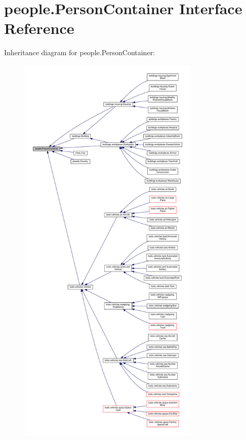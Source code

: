 \hypertarget{interfacepeople_1_1_person_container}{}\section{people.\+Person\+Container Interface Reference}
\label{interfacepeople_1_1_person_container}


Inheritance diagram for people.\+Person\+Container\+:
\nopagebreak
\begin{figure}[H]
\begin{center}
\leavevmode
\includegraphics[height=550pt]{interfacepeople_1_1_person_container__inherit__graph}
\end{center}
\end{figure}
